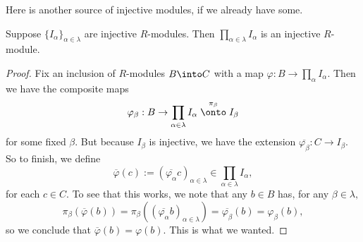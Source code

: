 \documentclass[../notes.tex]{subfiles}
\begin{document}
Here is another source of injective modules, if we already have some.
\begin{proposition}
	Suppose $\{I_\alpha\}_{\alpha\in\lambda}$ are injective $R$-modules. Then $\prod_{\alpha\in\lambda}I_\alpha$ is an injective $R$-module.
\end{proposition}
\begin{proof}
	Fix an inclusion of $R$-modules $B\into C$ with a map $\varphi:B\to\prod_{\alpha} I_\alpha.$ Then we have the composite maps
	\[\varphi_\beta:B\to\prod_{\alpha\in\lambda}I_\alpha\stackrel{\pi_\beta}\onto I_\beta\]
	for some fixed $\beta.$ But because $I_\beta$ is injective, we have the extension $\overline{\varphi_\beta}:C\to I_\beta.$ So to finish, we define
	\[\overline\varphi(c):=(\overline{\varphi_\alpha}c)_{\alpha\in\lambda}\in\prod_{\alpha\in\lambda}I_\alpha,\]
	for each $c\in C.$ To see that this works, we note that any $b\in B$ has, for any $\beta\in\lambda,$
	\[\pi_\beta(\overline\varphi(b))=\pi_\beta\left((\overline{\varphi_\alpha}b)_{\alpha\in\lambda}\right)=\overline{\varphi_\beta}(b)=\varphi_\beta(b),\]
	so we conclude that $\overline\varphi(b)=\varphi(b).$ This is what we wanted.
\end{proof}
\end{document}
